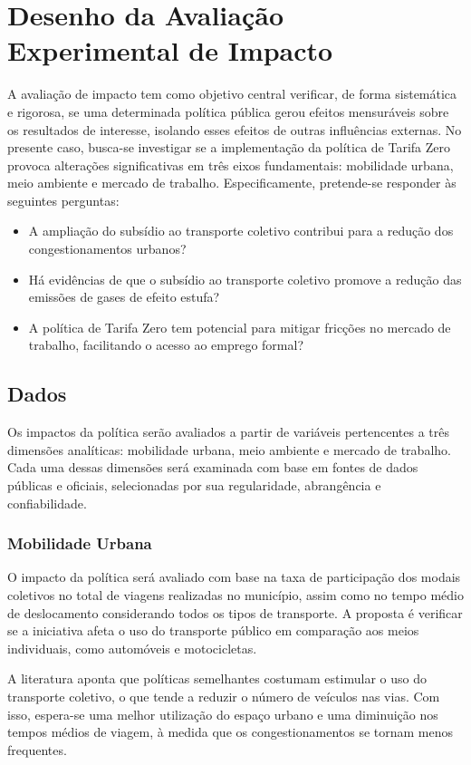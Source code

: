 
\section{Desenho da Avaliação Experimental de Impacto}
A avaliação de impacto tem como objetivo central verificar, de forma sistemática e rigorosa, se uma determinada política pública gerou efeitos mensuráveis sobre os resultados de interesse, isolando esses efeitos de outras influências externas. No presente caso, busca-se investigar se a implementação da política de Tarifa Zero provoca alterações significativas em três eixos fundamentais: mobilidade urbana, meio ambiente e mercado de trabalho. Especificamente, pretende-se responder às seguintes perguntas:

\begin{itemize} 
    \item A ampliação do subsídio ao transporte coletivo contribui para a redução dos congestionamentos urbanos? 
    \item Há evidências de que o subsídio ao transporte coletivo promove a redução das emissões de gases de efeito estufa? 
    \item A política de Tarifa Zero tem potencial para mitigar fricções no mercado de trabalho, facilitando o acesso ao emprego formal? 
\end{itemize}

\subsection{Dados}

Os impactos da política serão avaliados a partir de variáveis pertencentes a três dimensões analíticas: mobilidade urbana, meio ambiente e mercado de trabalho. Cada uma dessas dimensões será examinada com base em fontes de dados públicas e oficiais, selecionadas por sua regularidade, abrangência e confiabilidade.

\subsubsection{Mobilidade Urbana}
O impacto da política será avaliado com base na taxa de participação dos modais coletivos no total de viagens realizadas no município, assim como no tempo médio de deslocamento considerando todos os tipos de transporte. A proposta é verificar se a iniciativa afeta o uso do transporte público em comparação aos meios individuais, como automóveis e motocicletas.

A literatura aponta que políticas semelhantes costumam estimular o uso do transporte coletivo, o que tende a reduzir o número de veículos nas vias. Com isso, espera-se uma melhor utilização do espaço urbano e uma diminuição nos tempos médios de viagem, à medida que os congestionamentos se tornam menos frequentes.

